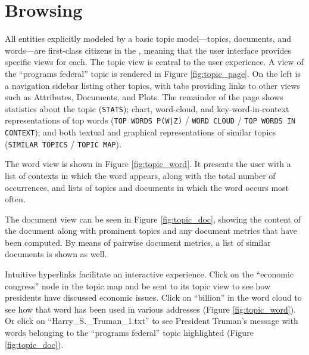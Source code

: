 \documentclass[11pt]{article}
\begin{document}
\section{Browsing}
All entities explicitly modeled by a basic topic model---topics, documents,
and words---are first-class citizens in the \tool, meaning that the user
interface provides specific views for each. The topic view
is central to the user experience. A view of the ``programs federal'' topic is
rendered in Figure \ref{fig:topic_page}. On the left is a navigation sidebar listing other topics,
with tabs providing links to other views such as Attributes, Documents, and Plots.
The remainder of the page shows statistics about the topic
(\texttt{STATS}); chart, word-cloud, and key-word-in-context representations of top
words (\texttt{TOP WORDS P(W|Z)} / \texttt{WORD CLOUD} / \texttt{TOP WORDS IN CONTEXT}); and
both textual and graphical representations of similar topics (\texttt{SIMILAR
TOPICS} / \texttt{TOPIC MAP}).

The word view is shown in Figure \ref{fig:topic_word}. It presents the user with
a list of contexts in which the word appears, along with the total number of
occurrences, and lists of topics and documents in which the word occurs most
often. 

The document view can be seen in Figure \ref{fig:topic_doc}, showing the content
of the document along with prominent topics and any document metrics that have been computed. By
means of pairwise document metrics, a list of similar documents is shown as
well.

Intuitive hyperlinks facilitate an interactive experience. Click on the
``economic congress'' node in the topic map and be sent to its topic view
to see how presidents have discussed economic issues. Click on ``billion'' in
the word cloud to see how that word has been used in various addresses (Figure
\ref{fig:topic_word}). Or click on ``Harry\_S.\_Truman\_1.txt'' to see
President Truman's message with words belonging to the ``programs federal''
topic highlighted (Figure \ref{fig:topic_doc}).

\end{document}
